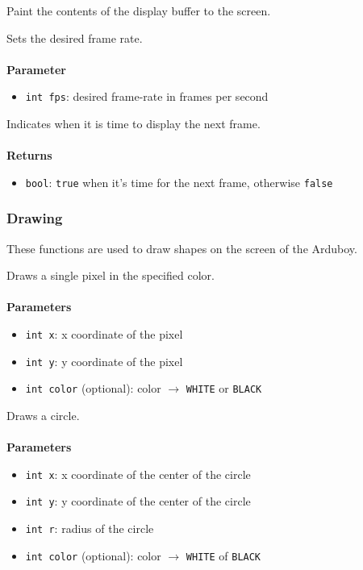 \documentclass[11pt,fleqn]{book} %
\begin{document}
\begin{libf}[display()]
	Paint the contents of the display buffer to the screen.
\end{libf}

\begin{libf}
	Sets the desired frame rate.\\ \\
	\textbf{Parameter}
	\begin{itemize}
		\item \texttt{int fps}: desired frame-rate in frames per second
	\end{itemize}
\end{libf}

\begin{libf}[nextFrame()]
	Indicates when it is time to display the next frame.\\ \\
	\textbf{Returns}
	\begin{itemize}
		\item \texttt{bool}: \texttt{true} when it's time for the next frame, otherwise \texttt{false}
	\end{itemize}
\end{libf}

\subsubsection{Drawing}
These functions are used to draw shapes on the screen of the Arduboy.

\begin{libf}[drawPixel(x, y, \emph{color=WHITE})]
	Draws a single pixel in the specified color.\\ \\
	\textbf{Parameters}
	\begin{itemize}
		\item \texttt{int x}: x coordinate of the pixel
		\item \texttt{int y}: y coordinate of the pixel
		\item \texttt{int color} (optional): color $\rightarrow$ \texttt{WHITE} or \texttt{BLACK}
	\end{itemize}
\end{libf}

\begin{libf}[drawCircle(x, y, r, \emph{color=WHITE})]
	Draws a circle.\\ \\
	\textbf{Parameters}
	\begin{itemize}
		\item \texttt{int x}: x coordinate of the center of the circle
		\item \texttt{int y}: y coordinate of the center of the circle
		\item \texttt{int r}: radius of the circle
		\item \texttt{int color} (optional): color $\rightarrow$ \texttt{WHITE} of \texttt{BLACK}
	\end{itemize}
\end{libf}
\end{document}
